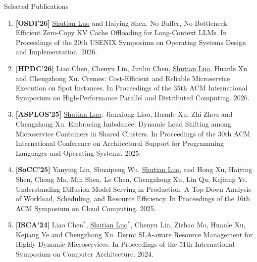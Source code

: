 \documentclass{resume} %
\begin{document}
\begin{rSection}{Selected Publications}
\begin{enumerate}
    \setlength{\leftmargin}{0em}
    \setlength{\itemsep}{0.2em}
    \setlength{\parskip}{0pt}
        \item \textbf{[OSDI'26]} \underline{Shutian Luo} and Haiying Shen. No Buffer, No Bottleneck: Efficient Zero-Copy KV Cache Offloading for Long-Context LLMs. In Proceedings of the 20th USENIX Symposium on Operating Systems Design and Implementation. 2026.
        \item \textbf{[HPDC'26]} Liao Chen, Chenyu Lin, Junlin Chen, \underline{Shutian Luo}, Huanle Xu and Chengzhong Xu. Cremes: Cost-Efficient and Reliable Microservice Execution on Spot Instances. In Proceedings of the 35th ACM International Symposium on High-Performance Parallel and Distributed Computing. 2026.
        \item \textbf{[ASPLOS'25]} \underline{Shutian Luo}, Jianxiong Liao, Huanle Xu, Zhi Zhou and Chengzhong Xu. Embracing Imbalance: Dynamic Load Shifting among Microservice Containers in Shared Clusters. In Proceedings of the 30th ACM International Conference on Architectural Support for Programming Languages and Operating Systems. 2025. 
        \item \textbf{[SoCC'25]} Yanying Lin, Shuaipeng Wu, \underline{Shutian Luo}, and Hong Xu, Haiying Shen, Chong Ma, Min Shen, Le Chen, Chengzhong Xu, Lin Qu, Kejiang Ye. Understanding Diffusion Model Serving in Production: A Top-Down Analysis of Workload, Scheduling, and Resource Efficiency. In Proceedings of the 16th ACM Symposium on Cloud Computing. 2025.
        \item \textbf{[ISCA'24]} {Liao Chen}$^*$, \underline{Shutian Luo$^*$}, Chenyu Lin, Zizhao Mo, Huanle Xu, Kejiang Ye and Chengzhong Xu. Derm: SLA-aware Resource Management for Highly Dynamic Microservices. In Proceedings of the 51th International Symposium on Computer Architecture. 2024. 

\end{enumerate}
\end{rSection}
\end{document}
